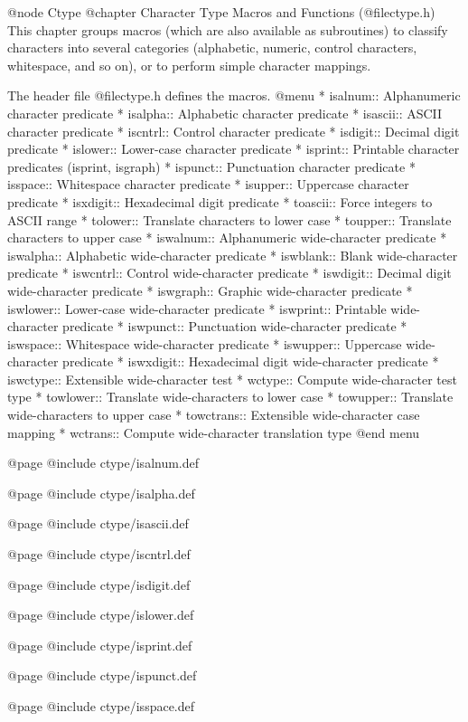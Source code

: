 @node Ctype
@chapter Character Type Macros and Functions (@file{ctype.h})
This chapter groups macros (which are also available as subroutines)
to classify characters into several categories (alphabetic,
numeric, control characters, whitespace, and so on), or to perform
simple character mappings.

The header file @file{ctype.h} defines the macros.
@menu 
* isalnum::   Alphanumeric character predicate
* isalpha::   Alphabetic character predicate
* isascii::   ASCII character predicate
* iscntrl::   Control character predicate
* isdigit::   Decimal digit predicate
* islower::   Lower-case character predicate
* isprint::   Printable character predicates (isprint, isgraph)
* ispunct::   Punctuation character predicate
* isspace::   Whitespace character predicate
* isupper::   Uppercase character predicate
* isxdigit::  Hexadecimal digit predicate
* toascii::   Force integers to ASCII range
* tolower::   Translate characters to lower case
* toupper::   Translate characters to upper case
* iswalnum::  Alphanumeric wide-character predicate
* iswalpha::  Alphabetic wide-character predicate
* iswblank::  Blank wide-character predicate
* iswcntrl::  Control wide-character predicate
* iswdigit::  Decimal digit wide-character predicate
* iswgraph::  Graphic wide-character predicate
* iswlower::  Lower-case wide-character predicate
* iswprint::  Printable wide-character predicate
* iswpunct::  Punctuation wide-character predicate
* iswspace::  Whitespace wide-character predicate
* iswupper::  Uppercase wide-character predicate
* iswxdigit:: Hexadecimal digit wide-character predicate
* iswctype::  Extensible wide-character test
* wctype::    Compute wide-character test type
* towlower::  Translate wide-characters to lower case
* towupper::  Translate wide-characters to upper case
* towctrans:: Extensible wide-character case mapping
* wctrans::   Compute wide-character translation type
@end menu

@page
@include ctype/isalnum.def

@page
@include ctype/isalpha.def

@page
@include ctype/isascii.def

@page
@include ctype/iscntrl.def

@page
@include ctype/isdigit.def

@page
@include ctype/islower.def

@page
@include ctype/isprint.def

@page
@include ctype/ispunct.def

@page
@include ctype/isspace.def

